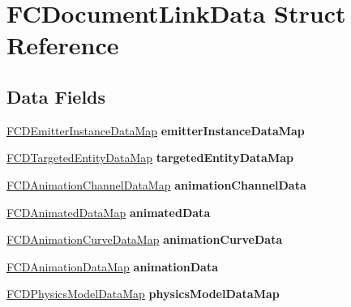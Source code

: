 \hypertarget{structFCDocumentLinkData}{
\section{FCDocumentLinkData Struct Reference}
\label{structFCDocumentLinkData}
}
\subsection*{Data Fields}
\begin{DoxyCompactItemize}
\item 
\hypertarget{structFCDocumentLinkData_a0c3f1d31591d1baf07466c2a61e78af0}{
\hyperlink{classfm_1_1map}{FCDEmitterInstanceDataMap} {\bfseries emitterInstanceDataMap}}
\label{structFCDocumentLinkData_a0c3f1d31591d1baf07466c2a61e78af0}

\item 
\hypertarget{structFCDocumentLinkData_afd134c63b465ba4b405e7beec6dcea2d}{
\hyperlink{classfm_1_1map}{FCDTargetedEntityDataMap} {\bfseries targetedEntityDataMap}}
\label{structFCDocumentLinkData_afd134c63b465ba4b405e7beec6dcea2d}

\item 
\hypertarget{structFCDocumentLinkData_af96a0d773cd367b2be866c4c0f31bff1}{
\hyperlink{classfm_1_1map}{FCDAnimationChannelDataMap} {\bfseries animationChannelData}}
\label{structFCDocumentLinkData_af96a0d773cd367b2be866c4c0f31bff1}

\item 
\hypertarget{structFCDocumentLinkData_aa77c19a022a5df12ebfc6b9dd3666fb0}{
\hyperlink{classfm_1_1map}{FCDAnimatedDataMap} {\bfseries animatedData}}
\label{structFCDocumentLinkData_aa77c19a022a5df12ebfc6b9dd3666fb0}

\item 
\hypertarget{structFCDocumentLinkData_ae535f19bc363c009ccdf92179f0854cb}{
\hyperlink{classfm_1_1map}{FCDAnimationCurveDataMap} {\bfseries animationCurveData}}
\label{structFCDocumentLinkData_ae535f19bc363c009ccdf92179f0854cb}

\item 
\hypertarget{structFCDocumentLinkData_a9efd378db1a5e8c7c4e1c285d4e6059c}{
\hyperlink{classfm_1_1map}{FCDAnimationDataMap} {\bfseries animationData}}
\label{structFCDocumentLinkData_a9efd378db1a5e8c7c4e1c285d4e6059c}

\item 
\hypertarget{structFCDocumentLinkData_aaccd7c0f195aff0804cf48a0a7a7cfe8}{
\hyperlink{classfm_1_1map}{FCDPhysicsModelDataMap} {\bfseries physicsModelDataMap}}
\label{structFCDocumentLinkData_aaccd7c0f195aff0804cf48a0a7a7cfe8}


\end{DoxyCompactItemize}
